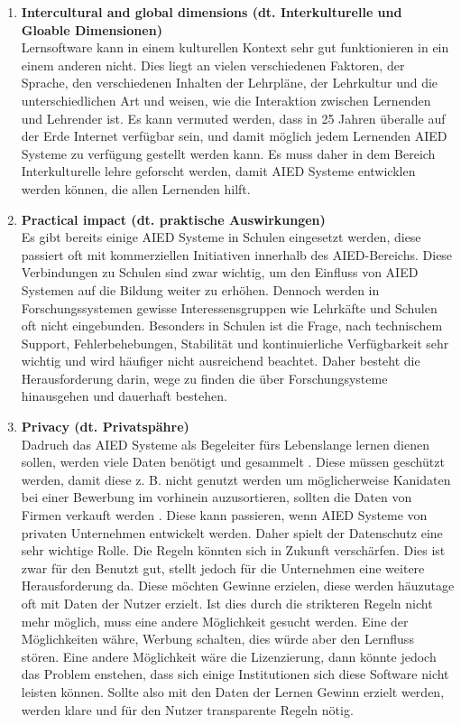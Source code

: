 \begin{enumerate}
    \item \textbf{Intercultural and global dimensions (dt. Interkulturelle und Gloable Dimensionen)} \\ 
    Lernsoftware kann in einem kulturellen Kontext sehr gut funktionieren in ein einem anderen nicht. Dies liegt an vielen verschiedenen Faktoren, der Sprache, den verschiedenen Inhalten der Lehrpläne,
    der Lehrkultur und die unterschiedlichen Art und weisen, wie die Interaktion zwischen Lernenden und Lehrender ist. Es kann vermuted werden, dass in 25 Jahren überalle auf der Erde Internet verfügbar sein,
    und damit möglich jedem Lernenden AIED Systeme zu verfügung gestellt werden kann. Es muss daher in dem Bereich Interkulturelle lehre geforscht werden, damit AIED Systeme entwicklen werden können, die allen Lernenden hilft. \cite[S. 9f]{Pinkwart.2016} 
    
    \item \textbf{Practical impact (dt. praktische Auswirkungen)} \\
    Es gibt bereits einige AIED Systeme in Schulen eingesetzt werden, diese passiert oft mit kommerziellen Initiativen innerhalb des AIED-Bereichs.
    Diese Verbindungen zu Schulen sind zwar wichtig, um den Einfluss von AIED Systemen auf die Bildung weiter zu erhöhen. Dennoch werden in Forschungssystemen gewisse Interessensgruppen wie Lehrkäfte und Schulen oft nicht eingebunden. 
    Besonders in Schulen ist die Frage, nach technischem Support, Fehlerbehebungen, Stabilität und kontinuierliche Verfügbarkeit sehr wichtig und wird häufiger nicht ausreichend beachtet. 
    Daher besteht die Herausforderung darin, wege zu finden die über Forschungsysteme hinausgehen und dauerhaft bestehen. \cite[S. 10]{Pinkwart.2016}

    \item \textbf{Privacy (dt. Privatspähre)} \\
    Dadruch das AIED Systeme als Begeleiter fürs Lebenslange lernen dienen sollen, werden viele Daten benötigt und gesammelt \cite[S. 10]{Pinkwart.2016}. 
    Diese müssen geschützt werden, damit diese z. B. nicht genutzt werden um möglicherweise Kanidaten bei einer Bewerbung im vorhinein auzusortieren, sollten die Daten von Firmen verkauft werden \cite[S. 9f]{Pinkwart.2016}.
    Diese kann passieren, wenn AIED Systeme von privaten Unternehmen entwickelt werden. Daher spielt der Datenschutz eine sehr wichtige Rolle. Die Regeln könnten sich in Zukunft verschärfen.
    Dies ist zwar für den Benutzt gut, stellt jedoch für die Unternehmen eine weitere Herausforderung da. Diese möchten Gewinne erzielen, diese werden häuzutage oft mit Daten der Nutzer erzielt.
    Ist dies durch die strikteren Regeln nicht mehr möglich, muss eine andere Möglichkeit gesucht werden. Eine der Möglichkeiten währe, Werbung schalten, dies würde aber den Lernfluss stören.
    Eine andere Möglichkeit wäre die Lizenzierung, dann könnte jedoch das Problem enstehen, dass sich einige Institutionen sich diese Software nicht leisten können.
    Sollte also mit den Daten der Lernen Gewinn erzielt werden, werden klare und für den Nutzer transparente Regeln nötig. \cite[S. 10f]{Pinkwart.2016}


\end{enumerate}
